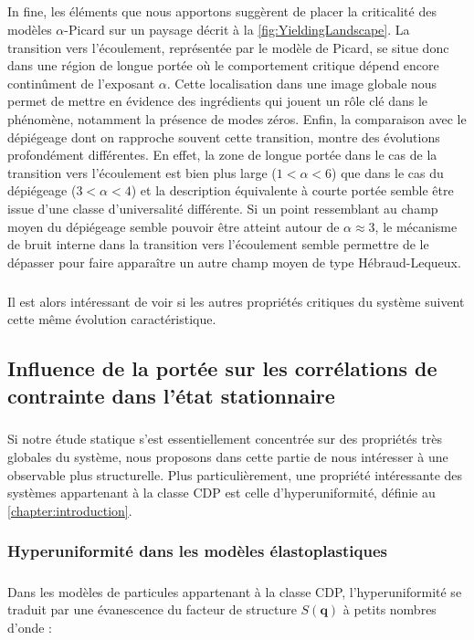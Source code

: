 \subparagraph{}In fine, les éléments que nous apportons suggèrent de placer la criticalité des modèles $\alpha$-Picard sur un paysage décrit à la \autoref{fig:YieldingLandscape}. La transition vers l'écoulement, représentée par le modèle de Picard, se situe donc dans une région de longue portée où le comportement critique dépend encore continûment de l'exposant $\alpha$. Cette localisation dans une image globale nous permet de mettre en évidence des ingrédients qui jouent un rôle clé dans le phénomène, notamment la présence de modes zéros. Enfin, la comparaison avec le dépiégeage dont on rapproche souvent cette transition, montre des évolutions profondément différentes. En effet, la zone de longue portée dans le cas de la transition vers l'écoulement est bien plus large ($1<\alpha<6$) que dans le cas du dépiégeage ($3<\alpha<4$) et la description équivalente à courte portée semble être issue d'une classe d'universalité différente. Si un point ressemblant au champ moyen du dépiégeage semble pouvoir être atteint autour de $\alpha\approx 3$, le mécanisme de bruit interne dans la transition vers l'écoulement semble permettre de le dépasser pour faire apparaître un autre champ moyen de type Hébraud-Lequeux.

\subparagraph{}Il est alors intéressant de voir si les autres propriétés critiques du système suivent cette même évolution caractéristique.

\subsection{Influence de la portée sur les corrélations de contrainte dans l'état stationnaire}

\subparagraph{}Si notre étude statique s'est essentiellement concentrée sur des propriétés très globales du système, nous proposons dans cette partie de nous intéresser à une observable plus structurelle. Plus particulièrement, une propriété intéressante des systèmes appartenant à la classe CDP est celle d'hyperuniformité, définie au \autoref{chapter:introduction}.

\subsubsection{Hyperuniformité dans les modèles élastoplastiques}

\subparagraph{}Dans les modèles de particules appartenant à la classe CDP, l'hyperuniformité se traduit par une évanescence du facteur de structure $S(\mathbf{q})$ à petits nombres d'onde :

